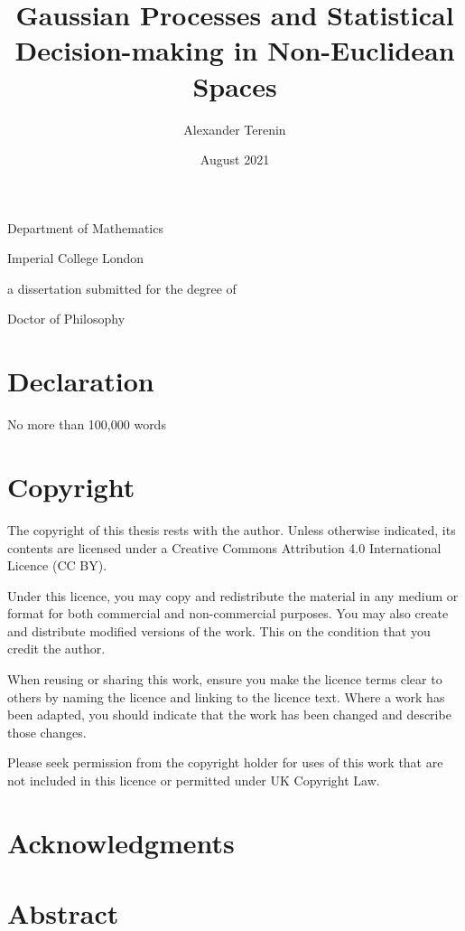 \documentclass[11pt]{book}
\title{Gaussian Processes and Statistical Decision-making in Non-Euclidean Spaces}
\author{Alexander Terenin}
\date{August 2021}
\begin{document}
\begin{titlepage}
\maketitlehooka
\centering
\huge
\null
\vfill
\thetitle
\par
\vfill
\LARGE
\theauthor
\par
\large
Department of Mathematics
\par
Imperial College London
\par
\vfill
\null
\vfill
a dissertation submitted for the degree of
\par
Doctor of Philosophy
\par
\strut
\par
\thedate
\par
\vfill
\null
\maketitlehookd
\end{titlepage}

\chapter*{Declaration}

No more than 100,000 words

\chapter*{Copyright}

The copyright of this thesis rests with the author. Unless otherwise indicated, its contents are licensed under a Creative Commons Attribution 4.0 International Licence (CC BY).

Under this licence, you may copy and redistribute the material in any medium or format for both commercial and non-commercial purposes. You may also create and distribute modified versions of the work. This on the condition that you credit the author.

When reusing or sharing this work, ensure you make the licence terms clear to others by naming the licence and linking to the licence text. Where a work has been adapted, you should indicate that the work has been changed and describe those changes.

Please seek permission from the copyright holder for uses of this work that are not included in this licence or permitted under UK Copyright Law.

\chapter*{Acknowledgments}

\chapter*{Abstract}
\end{document}
